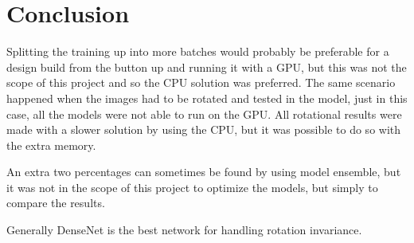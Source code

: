 \chapter{Conclusion}
\label{chp:conc}

Splitting the training up into more batches would probably be preferable for a design build from the button up and running it with a GPU, but this was not the scope of this project and so the CPU solution was preferred. The same scenario happened when the images had to be rotated and tested in the model, just in this case, all the models were not able to run on the GPU. All rotational results were made with a slower solution by using the CPU, but it was possible to do so with the extra memory.


An extra two percentages can sometimes be found by using model ensemble, but it was not in the scope of this project to optimize the models, but simply to compare the results.

Generally DenseNet is the best network for handling rotation invariance.